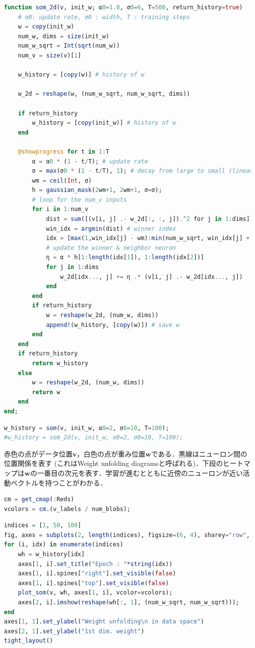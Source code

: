 \begin{lstlisting}[language=julia]
function som_2d(v, init_w; α0=1.0, σ0=6, T=500, return_history=true)
    # α0: update rate, σ0 : width, T : training steps
    w = copy(init_w)
    num_w, dims = size(init_w)
    num_w_sqrt = Int(sqrt(num_w))
    num_v = size(v)[1]
    
    w_history = [copy(w)] # history of w
    
    w_2d = reshape(w, (num_w_sqrt, num_w_sqrt, dims))
    
    if return_history
        w_history = [copy(init_w)] # history of w
    end
    
    @showprogress for t in 1:T
        α = α0 * (1 - t/T); # update rate
        σ = max(σ0 * (1 - t/T), 1); # decay from large to small (linearly decreased, avoid zero)
        wm = ceil(Int, σ)
        h = gaussian_mask(2wm+1, 2wm+1, σ=σ);
        # loop for the num_v inputs
        for i in 1:num_v
            dist = sum([(v[i, j] .- w_2d[:, :, j]).^2 for j in 1:dims]) # distance between input and neurons
            win_idx = argmin(dist) # winner index
            idx = [max(1,win_idx[j] - wm):min(num_w_sqrt, win_idx[j] + wm) for j in 1:2] # neighbor indices
            # update the winner & neighbor neuron
            η = α * h[1:length(idx[1]), 1:length(idx[2])]
            for j in 1:dims
                w_2d[idx..., j] += η .* (v[i, j] .- w_2d[idx..., j])
            end
        end
        if return_history
            w = reshape(w_2d, (num_w, dims))
            append!(w_history, [copy(w)]) # save w
        end
    end
    if return_history
        return w_history
    else
        w = reshape(w_2d, (num_w, dims))
        return w
    end
end;
\end{lstlisting}
\begin{lstlisting}[language=julia]
w_history = som(v, init_w, α0=2, σ0=10, T=100);
#w_history = som_2d(v, init_w, α0=2, σ0=10, T=100);
\end{lstlisting}
赤色の点がデータ位置$\mathbf{v}$，白色の点が重み位置$\mathbf{w}$である．黒線はニューロン間の位置関係を表す (これはWeight unfolding diagramsと呼ばれる)．下段のヒートマップは$\mathbf{w}$の一番目の次元を表す．学習が進むとともに近傍のニューロンが近い活動ベクトルを持つことがわかる．
\begin{lstlisting}[language=julia]
cm = get_cmap(:Reds) 
vcolors = cm.(v_labels / num_blobs);
\end{lstlisting}
\begin{lstlisting}[language=julia]
indices = [1, 50, 100]
fig, axes = subplots(2, length(indices), figsize=(6, 4), sharey="row", subplot_kw=Dict("box_aspect"=>1))
for (i, idx) in enumerate(indices)
    wh = w_history[idx]
    axes[1, i].set_title("Epoch : "*string(idx))
    axes[1, i].spines["right"].set_visible(false)
    axes[1, i].spines["top"].set_visible(false)
    plot_som(v, wh, axes[1, i], vcolor=vcolors);
    axes[2, i].imshow(reshape(wh[:, 1], (num_w_sqrt, num_w_sqrt)));
end
axes[1, 1].set_ylabel("Weight unfolding\n in data space")
axes[2, 1].set_ylabel("1st dim. weight")
tight_layout()
\end{lstlisting}
